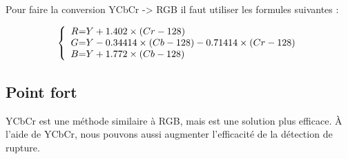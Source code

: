 Pour faire la conversion YCbCr -> RGB il faut utiliser les formules suivantes :

\[
 \left \{
 \begin{array}{c @{=} l}
	R & Y + 1.402 \times (Cr - 128) \\
	G & Y - 0.34414 \times (Cb - 128) - 0.71414 \times (Cr - 128) \\
	B & Y + 1.772 \times (Cb - 128) \\
 \end{array}
 \right.
\]


\subsection{Point fort}
YCbCr est une méthode similaire à RGB, mais est une solution plus efficace. À l’aide de YCbCr, nous pouvons aussi augmenter l’efficacité de la détection de rupture.
